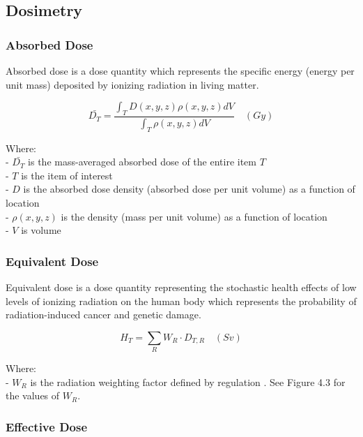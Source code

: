 \documentclass[12pt,a4paper]{report}
\begin{document}
\newpage

\subsection{Dosimetry}

\subsubsection{Absorbed Dose}

Absorbed dose is a dose quantity which represents the specific energy (energy per unit mass) deposited by ionizing radiation in living matter.

\begin{equation}
\bar{D_T}=\frac{\int_TD(x,y,z)\rho(x,y,z)dV}{\int_T\rho(x,y,z)dV} \quad (Gy)
\end{equation}

Where:
\\
- $\bar{D_T}$ is the mass-averaged absorbed dose of the entire item $T$\\
- $T$ is the item of interest\\
- $D$ is the absorbed dose density (absorbed dose per unit volume) as a function of location\\
- $\rho(x,y,z)$ is the density (mass per unit volume) as a function of location\\
- $V$ is volume



\subsubsection{Equivalent Dose}

\quad Equivalent dose is a dose quantity representing the stochastic health effects of low levels of ionizing radiation on the human body which represents the probability of radiation-induced cancer and genetic damage.

\begin{equation}
H_{T}=\sum _{R}W_{R}\cdot D_{T,R} \quad (Sv)
\end{equation}

Where:\\
- $W_R$ is the radiation weighting factor defined by regulation \citet{valentin20072007}. See Figure 4.3 for the values of $W_R$.


\subsubsection{Effective Dose}
\end{document}
